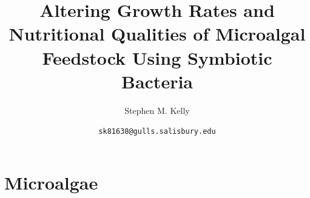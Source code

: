 \documentclass[8pt]{beamer}\usepackage[]{graphicx}\usepackage[]{color}
\begin{document}
 
\title[PPFM \& Algae]{Altering Growth Rates and Nutritional Qualities of Microalgal Feedstock Using Symbiotic Bacteria}
\author{Stephen M. Kelly}
\date{\texttt{sk81638@gulls.salisbury.edu}} %

\maketitle
\section{Microalgae}
\end{document}
